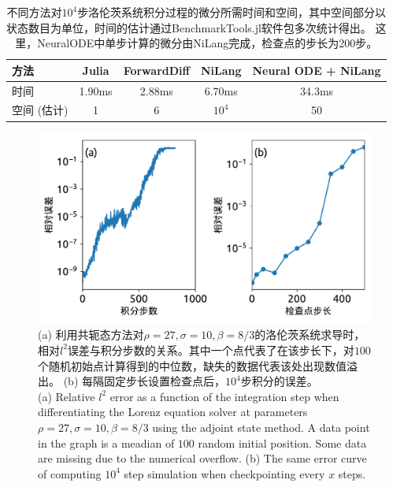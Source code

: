 \documentclass[A4,twoside,UTF8]{ctexart}
\begin{document}
\begin{table}\centering
    \begin{tabularx}{0.8\textwidth}{Xcccc}\toprule
        方法 & Julia & ForwardDiff & NiLang & Neural ODE + NiLang\\
        \hline
        时间          & 1.90ms   &  2.88ms & 6.70ms & 34.3ms\\  %
        空间 (估计)          & 1   &  6 & $10^4$ & 50\\  %
        \bottomrule
    \end{tabularx}
    \caption{不同方法对$10^4$步洛伦茨系统积分过程的微分所需时间和空间，其中空间部分以状态数目为单位，时间的估计通过BenchmarkTools.jl软件包多次统计得出。
    这里，NeuralODE中单步计算的微分由NiLang完成，检查点的步长为200步。}\label{tbl:lorenztiming}
\end{table}

\begin{figure}[t]
\centering
\includegraphics[width=0.6\columnwidth]{./fig2.pdf}
    \caption{(a) 利用共轭态方法对$\rho=27, \sigma=10, \beta=8/3$的洛伦茨系统求导时，相对$l^2$误差与积分步数的关系。其中一个点代表了在该步长下，对$100$个随机初始点计算得到的中位数，缺失的数据代表该处出现数值溢出。 (b) 每隔固定步长设置检查点后，$10^4$步积分的误差。\\
    (a) Relative $l^2$ error as a function of the integration step when differentiating the Lorenz equation solver at parameters $\rho=27, \sigma=10, \beta=8/3$ using the adjoint state method.
    A data point in the graph is a meadian of $100$ random initial position. Some data are missing due to the numerical overflow.
    (b) The same error curve of computing $10^4$ step simulation when checkpointing every $x$ steps.
    }\label{fig:neuralode-error}
\end{figure}


\baselineskip
\end{document}
